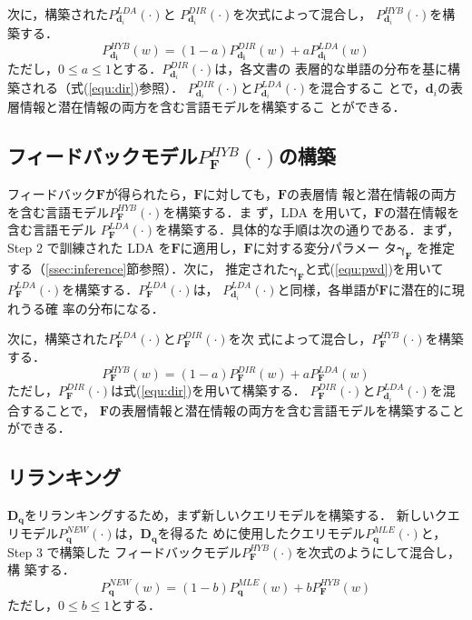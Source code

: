 \documentclass[japanese]{jnlp_1.4}
\begin{document}
次に，構築された$P^{LDA}_{\bm{d}_{i}}(\cdot)$と
$P^{DIR}_{\bm{d}_{i}}(\cdot)$を次式によって混合し，
$P^{HYB}_{\bm{d}_{i}}(\cdot)$を構築する．
\begin{equation}
 P^{HYB}_{\bm{d_{i}}}(w)
 = (1 - a) P^{DIR}_{\bm{d_{i}}}(w) + a P^{LDA}_{\bm{d_{i}}}(w)
 \label{equ:hdm}
\end{equation}
ただし，$0 \le a \le 1$とする．$P^{DIR}_{\bm{d}_{i}}(\cdot)$は，各文書の
表層的な単語の分布を基に構築される（式(\ref{equ:dir})参照）．
$P^{DIR}_{\bm{d}_{i}}(\cdot)$と$P^{LDA}_{\bm{d}_{i}}(\cdot)$を混合するこ
とで，$\bm{d}_{i}$の表層情報と潜在情報の両方を含む言語モデルを構築するこ
とができる．



\subsection{フィードバックモデル$P^{HYB}_{\bm{F}}(\cdot)$の構築}
\label{ssec:hfm_construction}

フィードバック$\bm{F}$が得られたら，$\bm{F}$に対しても，$\bm{F}$の表層情
報と潜在情報の両方を含む言語モデル$P^{HYB}_{\bm{F}}(\cdot)$を構築する．ま
ず，LDA を用いて，$\bm{F}$の潜在情報を含む言語モデル
$P^{LDA}_{\bm{F}}(\cdot)$を構築する．具体的な手順は次の通りである．まず，
Step 2 で訓練された LDA を$\bm{F}$に適用し，$\bm{F}$に対する変分パラメー
タ$\bm{\gamma}_{\bm{F}}$ を推定する（\ref{ssec:inference}節参照）．次に，
推定された$\bm{\gamma}_{\bm{F}}$と式(\ref{equ:pwd})を用いて
$P^{LDA}_{\bm{F}}(\cdot)$を構築する．$P^{LDA}_{\bm{F}}(\cdot)$は，
$P^{LDA}_{\bm{d}_{i}}(\cdot)$と同様，各単語が$\bm{F}$に潜在的に現れうる確
率の分布になる．

次に，構築された$P_{\bm{F}}^{LDA}(\cdot)$と$P^{DIR}_{\bm{F}}(\cdot)$を次
式によって混合し，$P^{HYB}_{\bm{F}}(\cdot)$を構築する．
\begin{equation}
 P^{HYB}_{\bm{F}}(w)
 = (1 - a) P^{DIR}_{\bm{F}}(w) + a P^{LDA}_{\bm{F}}(w)
 \label{equ:hfm}
\end{equation}
ただし，$P^{DIR}_{\bm{F}}(\cdot)$は式(\ref{equ:dir})を用いて構築する．
$P_{\bm{F}}^{DIR}(\cdot)$と$P^{LDA}_{\bm{d}_{i}}(\cdot)$を混合することで，
$\bm{F}$の表層情報と潜在情報の両方を含む言語モデルを構築することができる．



\subsection{リランキング}

$\bm{D}_{\bm{q}}$をリランキングするため，まず新しいクエリモデルを構築する．
新しいクエリモデル$P^{NEW}_{\bm{q}}(\cdot)$は，$\bm{D}_{\bm{q}}$を得るた
めに使用したクエリモデル$P^{MLE}_{\bm{q}}(\cdot)$と，Step 3 で構築した
フィードバックモデル$P^{HYB}_{\bm{F}}(\cdot)$を次式のようにして混合し，構
築する．
\begin{equation}
 P^{NEW}_{\bm{q}}(w)
 = (1 - b) P^{MLE}_{\bm{q}}(w) + b P^{HYB}_{\bm{F}}(w)
 \label{equ:nqm}
\end{equation}
ただし，$0 \le b \le 1$とする．
\end{document}
